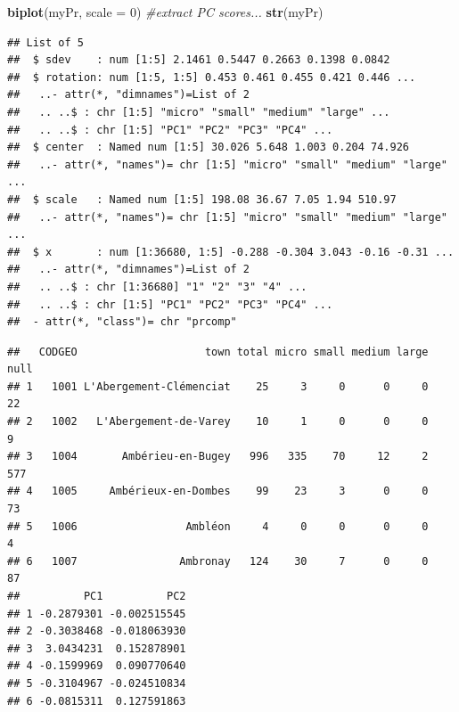\documentclass[]{article}
\newenvironment{Shaded}{\begin{snugshade}}{\end{snugshade}}
\newcommand{\KeywordTok}[1]{\textcolor[rgb]{0.13,0.29,0.53}{\textbf{#1}}}
\newcommand{\DataTypeTok}[1]{\textcolor[rgb]{0.13,0.29,0.53}{#1}}
\newcommand{\DecValTok}[1]{\textcolor[rgb]{0.00,0.00,0.81}{#1}}
\newcommand{\StringTok}[1]{\textcolor[rgb]{0.31,0.60,0.02}{#1}}
\newcommand{\CommentTok}[1]{\textcolor[rgb]{0.56,0.35,0.01}{\textit{#1}}}
\newcommand{\OperatorTok}[1]{\textcolor[rgb]{0.81,0.36,0.00}{\textbf{#1}}}
\newcommand{\NormalTok}[1]{#1}
\begin{document}
\begin{Shaded}
\begin{Highlighting}[]
\KeywordTok{biplot}\NormalTok{(myPr, }\DataTypeTok{scale =} \DecValTok{0}\NormalTok{)}
\CommentTok{#extract PC scores...}
\KeywordTok{str}\NormalTok{(myPr)}
\end{Highlighting}
\end{Shaded}

\begin{verbatim}
## List of 5
##  $ sdev    : num [1:5] 2.1461 0.5447 0.2663 0.1398 0.0842
##  $ rotation: num [1:5, 1:5] 0.453 0.461 0.455 0.421 0.446 ...
##   ..- attr(*, "dimnames")=List of 2
##   .. ..$ : chr [1:5] "micro" "small" "medium" "large" ...
##   .. ..$ : chr [1:5] "PC1" "PC2" "PC3" "PC4" ...
##  $ center  : Named num [1:5] 30.026 5.648 1.003 0.204 74.926
##   ..- attr(*, "names")= chr [1:5] "micro" "small" "medium" "large" ...
##  $ scale   : Named num [1:5] 198.08 36.67 7.05 1.94 510.97
##   ..- attr(*, "names")= chr [1:5] "micro" "small" "medium" "large" ...
##  $ x       : num [1:36680, 1:5] -0.288 -0.304 3.043 -0.16 -0.31 ...
##   ..- attr(*, "dimnames")=List of 2
##   .. ..$ : chr [1:36680] "1" "2" "3" "4" ...
##   .. ..$ : chr [1:5] "PC1" "PC2" "PC3" "PC4" ...
##  - attr(*, "class")= chr "prcomp"
\end{verbatim}

\begin{Shaded}
\end{Shaded}

\begin{verbatim}
##   CODGEO                    town total micro small medium large null
## 1   1001 L'Abergement-Clémenciat    25     3     0      0     0   22
## 2   1002   L'Abergement-de-Varey    10     1     0      0     0    9
## 3   1004       Ambérieu-en-Bugey   996   335    70     12     2  577
## 4   1005     Ambérieux-en-Dombes    99    23     3      0     0   73
## 5   1006                 Ambléon     4     0     0      0     0    4
## 6   1007                Ambronay   124    30     7      0     0   87
##          PC1          PC2
## 1 -0.2879301 -0.002515545
## 2 -0.3038468 -0.018063930
## 3  3.0434231  0.152878901
## 4 -0.1599969  0.090770640
## 5 -0.3104967 -0.024510834
## 6 -0.0815311  0.127591863
\end{verbatim}
\end{document}
